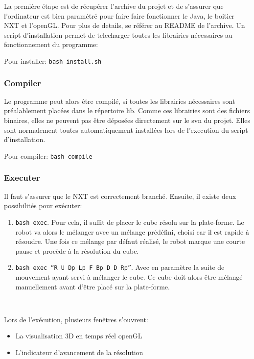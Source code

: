 \documentclass[a4paper,12pt]{article}
\begin{document}
La première étape est de récupérer l'archive du projet et de s'assurer que l'ordinateur est bien paramétré pour faire faire fonctionner le Java, le boitier NXT et l'openGL. Pour plus de details, se référer au README de l'archive. Un script d'installation permet de telecharger toutes les librairies nécessaires au fonctionnement du programme:

Pour installer: \texttt{bash install.sh}

\subsubsection{Compiler}

Le programme peut alors être compilé, si toutes les librairies nécessaires sont préalablement placées dans le répertoire lib. Comme ces librairies sont des fichiers binaires, elles ne peuvent pas être déposées directement sur le svn du projet. Elles sont normalement toutes automatiquement installées lors de l'execution du script d'installation.

Pour compiler: \texttt{bash compile}

\subsubsection{Executer}

Il faut s'assurer que le NXT est correctement branché. Ensuite, il existe deux possibilités pour exécuter:

\begin{enumerate}
 \item \texttt{bash exec}. Pour cela, il suffit de placer le cube résolu sur la plate-forme. Le robot va alors le mélanger avec un mélange prédéfini, choisi car il est rapide à résoudre. Une fois ce mélange par défaut réalisé, le robot marque une courte pause et procède à la résolution du cube. 
 \item \texttt{bash exec ``R U Dp Lp F Bp D D Rp''}. Avec en paramètre la suite de mouvement ayant servi à mélanger le cube. Ce cube doit alors être mélangé manuellement avant d'être placé sur la plate-forme.
\end{enumerate}

~

Lors de l'exécution, plusieurs fenêtres s'ouvrent:
\begin{itemize}
 \item La visualisation 3D en temps réel openGL
 \item L'indicateur d'avancement de la résolution

\end{itemize}
\end{document}

